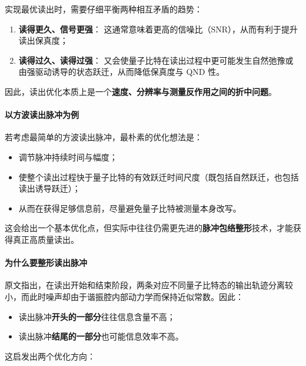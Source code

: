 \documentclass[12pt,a4paper,oneside]{ctexbook}
\begin{document}
实现最优读出时，需要仔细平衡两种相互矛盾的趋势：

\begin{enumerate}
    \item \textbf{读得更久、信号更强}：
    这通常意味着更高的信噪比（SNR），从而有利于提升读出保真度；

    \item \textbf{读得过久、读得过强}：
    又会使量子比特在读出过程中更可能发生自然弛豫或由强驱动诱导的状态跃迁，从而降低保真度与 QND 性。
\end{enumerate}

因此，读出优化本质上是一个\textbf{速度、分辨率与测量反作用之间的折中问题}。

\paragraph{以方波读出脉冲为例}
若考虑最简单的方波读出脉冲，最朴素的优化想法是：
\begin{itemize}
    \item 调节脉冲持续时间与幅度；
    \item 使整个读出过程快于量子比特的有效跃迁时间尺度（既包括自然跃迁，也包括读出诱导跃迁）；
    \item 从而在获得足够信息前，尽量避免量子比特被测量本身改写。
\end{itemize}

这会给出一个基本优化点，但实际中往往仍需更先进的\textbf{脉冲包络整形}技术，才能获得真正高质量读出。

\paragraph{为什么要整形读出脉冲}
原文指出，在读出开始和结束阶段，两条对应不同量子比特态的输出轨迹分离较小，而此时噪声却由于谐振腔内部动力学而保持近似常数。因此：
\begin{itemize}
    \item 读出脉冲\textbf{开头的一部分}往往信息含量不高；
    \item 读出脉冲\textbf{结尾的一部分}也可能信息效率不高。
\end{itemize}

这启发出两个优化方向：
\end{document}
